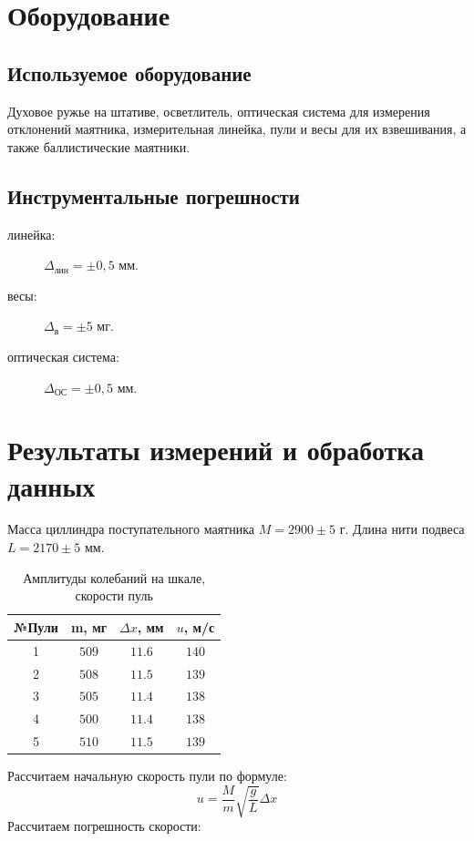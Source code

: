 \documentclass[a4paper]{article}
\begin{document}
\section{Оборудование}
\subsection{Используемое оборудование}
Духовое ружье на штативе, осветлитель, оптическая система для измерения отклонений маятника, измерительная линейка, пули и весы для их взвешивания, а также баллистические маятники. 
\subsection{Инструментальные погрешности}
\vspace{0.15 cm}

\begin{description}
    \item[линейка:] $\Delta_\text{лин}=\pm0,5$ мм.
    \item[весы:] $\Delta_\text{в}=\pm 5$ мг.
    \item[оптическая система:] $\Delta_\text{ОС}=\pm0,5$ мм.
\end{description}

\section{Результаты измерений и обработка данных}
Масса циллиндра поступательного маятника $M = 2900 \pm 5$ г. Длина нити подвеса $L = 2170 \pm 5$ мм.

\begin{table}[!h]
\centering
\caption{Амплитуды колебаний на шкале, скорости пуль}
\begin{tabular}{|c|c|c|c|}        \hline
    №Пули & m, мг & $\Delta x$, мм & $u$, м/с \\  \hline
    1 & $509$ & $11.6$ & $140$\\ \hline
    2 & $508$ & $11.5$ & $139$\\ \hline
    3 & $505$ & $11.4$ & $138$\\ \hline
    4 & $500$ & $11.4$ & $138$\\ \hline
    5 & $510$ & $11.5$ & $139$\\ \hline
\end{tabular}
\end{table}
\newpage

\noindent Рассчитаем начальную скорость пули по формуле:
\[u = \frac{M}{m} \sqrt{\frac{g}{L}} \Delta x\]
Рассчитаем погрешность скорости:
\end{document}
